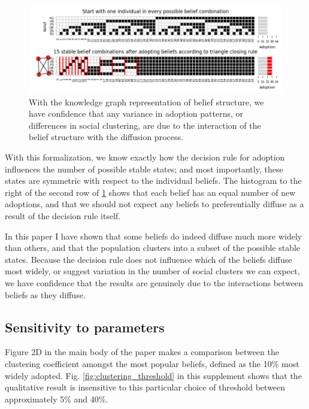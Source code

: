 \documentclass{article}
\begin{document}
\begin{figure}[h!]
\centering
\includegraphics[width=1.0\columnwidth]{rule triangle closing.png}
\caption{With the knowledge graph representation of belief structure, we have confidence that any variance in adoption patterns, or differences in social clustering, are due to the interaction of the belief structure with the diffusion process.}
\label{fig:rule_triangle}
\end{figure}

With this formalization, we know exactly how the decision rule for adoption influences the number of possible stable states; and most importantly, these states are symmetric with respect to the individual beliefs. The histogram to the right of the second row of \ref{fig:rule_triangle} shows that each belief has an equal number of new adoptions, and that we should not expect any beliefs to preferentially diffuse as a result of the decision rule itself. 

In this paper I have shown that some beliefs do indeed diffuse much more widely than others, and that the population clusters into a subset of the possible stable states. Because the decision rule does not influence which of the beliefs diffuse most widely, or suggest variation in the number of social clusters we can expect, we have confidence that the results are genuinely due to the interactions between beliefs as they diffuse.


\subsection{Sensitivity to parameters}
\label{section:thresholds}
Figure 2D in the main body of the paper makes a comparison between the clustering coefficient amongst the most popular beliefs, defined as the 10\% most widely adopted. Fig. \ref{fig:clustering_threshold} in this supplement shows that the qualitative result is insensitive to this particular choice of threshold between approximately 5\% and 40\%.
\end{document}
